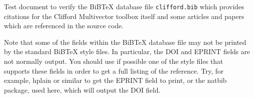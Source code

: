 \documentclass{article}
\begin{document}
Test document to verify the BiBTeX database file \texttt{clifford.bib}
which provides citations for the Clifford Multivector toolbox itself and
some articles and papers which are referenced in the source code.

Note that some of the fields within the BiBTeX database file may not be
printed by the standard BiBTeX style files. In particular, the DOI and
EPRINT fields are not normally output. You should use if possible one of
the style files that supports these fields in order to get a full listing
of the reference. Try, for example, hplain or similar to get the EPRINT
field to print, or the natbib package, used here, which will output the
DOI field.
\nocite{*}


\end{document}
